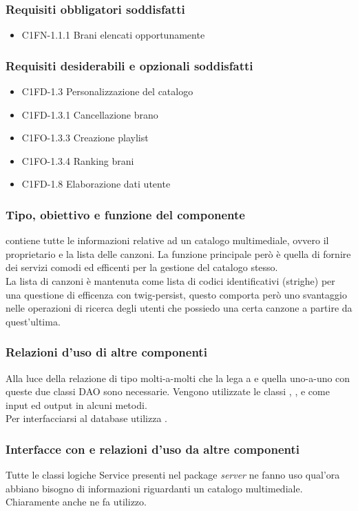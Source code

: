 \subsubsection*{Requisiti obbligatori soddisfatti}
\begin{itemize}
	\item C1FN-1.1.1 Brani elencati opportunamente
\end{itemize}
\subsubsection*{Requisiti desiderabili e opzionali soddisfatti}
\begin{itemize}
    \item C1FD-1.3 Personalizzazione del catalogo
    \item C1FD-1.3.1 Cancellazione brano
    \item C1FO-1.3.3 Creazione playlist 
    \item C1FO-1.3.4 Ranking brani
    \item C1FD-1.8 Elaborazione dati utente
\end{itemize}
\subsubsection*{Tipo, obiettivo e funzione del componente} 
contiene tutte le informazioni relative ad un catalogo multimediale, ovvero
il proprietario e la lista delle canzoni. La funzione principale per\`o \`e
quella di fornire dei servizi comodi ed efficenti per la gestione del catalogo
stesso.\\
La lista di canzoni \`e mantenuta come lista di codici identificativi (strighe)
per una questione di efficenza con twig-persist, questo comporta per\`o uno
svantaggio nelle operazioni di ricerca degli utenti che possiedo una certa
canzone a partire da quest'ultima. 
\subsubsection*{Relazioni d'uso di altre componenti}
Alla luce della relazione di tipo molti-a-molti che la lega a  e quella
uno-a-uno con  queste due classi DAO sono necessarie. Vengono
utilizzate le classi , ,
 e  come input ed output in alcuni metodi.\\ Per interfacciarsi al database utilizza .
\subsubsection*{Interfacce con e relazioni d'uso da
altre componenti} Tutte le classi logiche Service presenti nel package
\emph{server} ne fanno uso qual'ora abbiano bisogno di informazioni riguardanti
un catalogo multimediale. Chiaramente anche  ne fa utilizzo.
